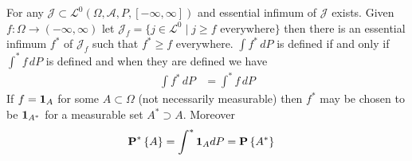 \begin{thm}\label{ExistenceMeasurableCover}For any $\mathcal{J} \subset \mathcal{L}^0(\Omega, \mathcal{A}, P, [-\infty, \infty])$ and essential infimum of $\mathcal{J}$ exists.  Given $f : \Omega \to (-\infty, \infty)$ let
$\mathcal{J}_f = \lbrace j \in \mathcal{L}^0 \mid j \geq f \text{ everywhere} \rbrace$ then there is an essential infimum $f^*$ of $\mathcal{J}_f$ such that $f^* \geq f$ everywhere.  $\int f^* \, dP$ is 
defined if and only if $\int^* f \, dP$ is defined and when they are defined we have
\begin{align*}
\int f^* \, dP &= \int^* f \, dP
\end{align*}
If $f = \textbf{1}_{A}$ for some $A \subset \Omega$ (not necessarily measurable) then $f^*$ may be chosen to be $\textbf{1}_{A^*}$ for a measurable set $A^* \supset A$.  Moreover \begin{align*}
\textbf{P}^* \left \{A \right \} &= \int^* \textbf{1}_{A} dP = \textbf{P}\left \{A^* \right \}
\end{align*}
\end{thm}
